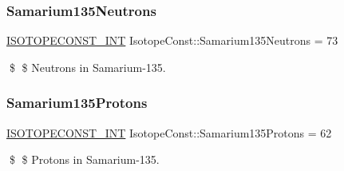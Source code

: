 \subsubsection{\texorpdfstring{Samarium135\+Neutrons}{Samarium135Neutrons}}
{\footnotesize\ttfamily \mbox{\hyperlink{group___isotope_const-_macros_ga5f18360b3e99483a35c32d789e62621c}{I\+S\+O\+T\+O\+P\+E\+C\+O\+N\+S\+T\+\_\+\+I\+NT}} Isotope\+Const\+::\+Samarium135\+Neutrons = 73}

\$ \$ Neutrons in Samarium-\/135. \mbox{\label{group___isotope_const-_samarium-_sm135_gae26f7a08bab118360524c03e06731290}} 
\subsubsection{\texorpdfstring{Samarium135\+Protons}{Samarium135Protons}}
{\footnotesize\ttfamily \mbox{\hyperlink{group___isotope_const-_macros_ga5f18360b3e99483a35c32d789e62621c}{I\+S\+O\+T\+O\+P\+E\+C\+O\+N\+S\+T\+\_\+\+I\+NT}} Isotope\+Const\+::\+Samarium135\+Protons = 62}

\$ \$ Protons in Samarium-\/135. 